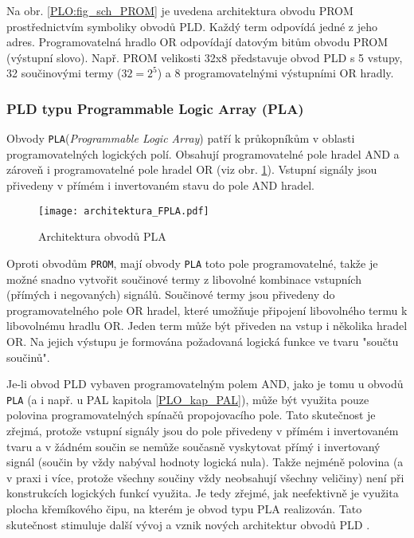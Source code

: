 {        Na obr. \ref{PLO:fig_sch_PROM} je uvedena architektura obvodu PROM prostřednictvím
        symboliky obvodů PLD. Každý term odpovídá jedné z jeho adres. Programovatelná hradlo OR
        odpovídají datovým bitům obvodu PROM (výstupní slovo). Např. PROM velikosti 32x8
        představuje obvod PLD s 5 vstupy, 32 součinovými termy ($32=2^5$) a 8 programovatelnými
        výstupními OR hradly.

     \subsubsection{PLD typu Programmable Logic Array (PLA)}\label{PLO_kap_FPLA}
        Obvody \texttt{PLA}(\emph{Programmable Logic Array}) patří k průkopníkům v oblasti
        programovatelných logických polí. Obsahují programovatelné pole hradel AND a zároveň i
        programovatelné pole hradel OR (viz obr. \ref{PLO:fig_arch_FPLA}).
        Vstupní signály jsou přivedeny v přímém i invertovaném stavu do pole AND hradel.
        \begin{figure}[ht!]
          \centering
          \texttt{[image: architektura\_FPLA.pdf]}
          \caption[Architektura obvodů PLA]{Architektura obvodů PLA}
          \label{PLO:fig_arch_FPLA}
        \end{figure}
        
        Oproti obvodům \texttt{PROM}, mají obvody \texttt{PLA} toto pole programovatelné, takže je
        možné snadno vytvořit součinové termy z libovolné kombinace vstupních (přímých i
        negovaných) signálů. Součinové termy jsou přivedeny do programovatelného pole OR hradel,
        které umožňuje připojení libovolného termu k libovolnému hradlu OR. Jeden term může být
        přiveden na vstup i několika hradel OR. Na jejich výstupu je formována požadovaná logická
        funkce ve tvaru "součtu součinů".

        Je-li obvod PLD vybaven programovatelným polem AND, jako je tomu u obvodů \texttt{PLA} (a i
        např. u PAL kapitola \ref{PLO_kap_PAL}), může být využita pouze polovina programovatelných
        spínačů propojovacího pole. Tato skutečnost je zřejmá, protože vstupní signály jsou do pole
        přivedeny v přímém i invertovaném tvaru a v žádném součin se nemůže současně vyskytovat
        přímý i invertovaný signál (součin by vždy nabýval hodnoty logická nula). Takže nejméně
        polovina (a v praxi i více, protože všechny součiny vždy neobsahují všechny veličiny) není
        při konstrukcích logických funkcí využita. Je tedy zřejmé, jak neefektivně je využita
        plocha křemíkového čipu, na kterém je obvod typu PLA realizován. Tato skutečnost stimuluje
        další vývoj a vznik nových architektur obvodů PLD \cite[s.~63]{PLD_Grada}.
        
}
